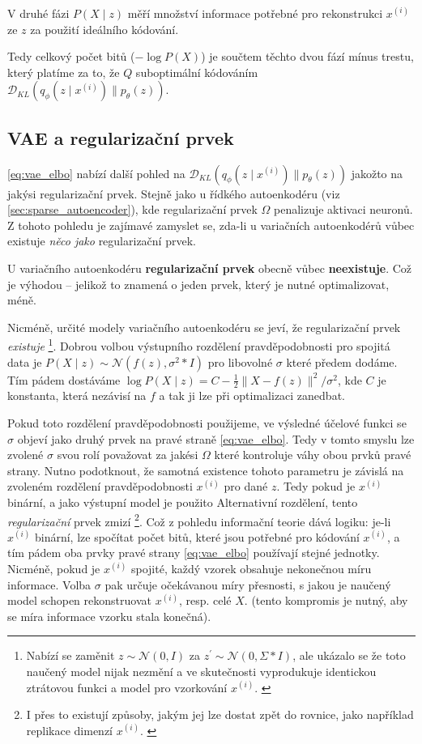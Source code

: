 V druhé fázi $P(X\mid z)$ měří množství informace potřebné pro rekonstrukci $x^{(i)}$ ze $z$ za použití ideálního kódování.

Tedy celkový počet bitů ($- \log P(X)$) je součtem těchto dvou fází mínus trestu, který platíme za to, že $Q$ suboptimální kódováním $\mathcal{D}_{KL}(q_\phi(z\mid x^{(i)})\parallel p_\theta(z))$. 


\subsection{VAE a regularizační prvek}
\autoref{eq:vae_elbo} nabízí další pohled na $\mathcal{D}_{KL}(q_\phi(z\mid x^{(i)})\parallel p_\theta(z))$ jakožto na jakýsi regularizační prvek.
Stejně jako u řídkého autoenkodéru (viz \autoref{sec:sparse_autoencoder}), kde regularizační prvek $\Omega$ penalizuje aktivaci neuronů.
Z tohoto pohledu je zajímavé zamyslet se, zda-li u variačních autoenkodérů vůbec existuje \emph{něco jako} regularizační prvek.

U variačního autoenkodéru \textbf{regularizační prvek} obecně vůbec \textbf{neexistuje}.
Což je výhodou – jelikož to znamená o jeden prvek, který je nutné optimalizovat, méně.

Nicméně, určité modely variačního autoenkodéru se jeví, že regularizační prvek \emph{existuje}
\footnote{Nabízí se zaměnit $z \sim \mathcal{N}(0, I)$ za $z^\prime \sim \mathcal{N}(0, \Sigma * I)$, ale ukázalo se že toto naučený model nijak nezmění a ve skutečnosti vyprodukuje identickou ztrátovou funkci a model pro vzorkování $x^{(i)}$. \cite{Doersch2021}}.
Dobrou volbou výstupního rozdělení pravděpodobnosti pro spojitá data je $P(X\mid z) \sim \mathcal{N}(f(z), \sigma^2 * I)$ pro libovolné $\sigma$ které předem dodáme.
Tím pádem dostáváme $\log P(X\mid z) = C - \frac{1}{2} \| X - f(z) \|^2 / \sigma^2$, kde $C$ je konstanta, která nezávisí na $f$ a tak ji lze při optimalizaci zanedbat.

Pokud toto rozdělení pravděpodobnosti použijeme, ve výsledné účelové funkci se $\sigma$ objeví jako druhý prvek na pravé straně \autoref{eq:vae_elbo}.
Tedy v tomto smyslu lze zvolené $\sigma$ svou rolí považovat za jakési $\Omega$ které kontroluje váhy obou prvků pravé strany.
Nutno podotknout, že samotná existence tohoto parametru je závislá na zvoleném rozdělení pravděpodobnosti $x^{(i)}$ pro dané $z$.
Tedy pokud je $x^{(i)}$ binární, a jako výstupní model je použito Alternativní rozdělení, tento \emph{regularizační} prvek zmizí 
\footnote{I přes to existují způsoby, jakým jej lze dostat zpět do rovnice, jako například replikace dimenzí $x^{(i)}$. \cite{Doersch2021}}.
Což z pohledu informační teorie dává logiku: je-li $x^{(i)}$ binární, lze spočítat počet bitů, které jsou potřebné pro kódování $x^{(i)}$, a tím pádem oba prvky pravé strany \autoref{eq:vae_elbo} používají stejné jednotky.
Nicméně, pokud je $x^{(i)}$ spojité, každý vzorek obsahuje nekonečnou míru informace. Volba $\sigma$ pak určuje očekávanou míry přesnosti, s jakou je naučený model schopen rekonstruovat $x^{(i)}$, resp. celé $X$. (tento kompromis je nutný, aby se míra informace vzorku stala konečná).
